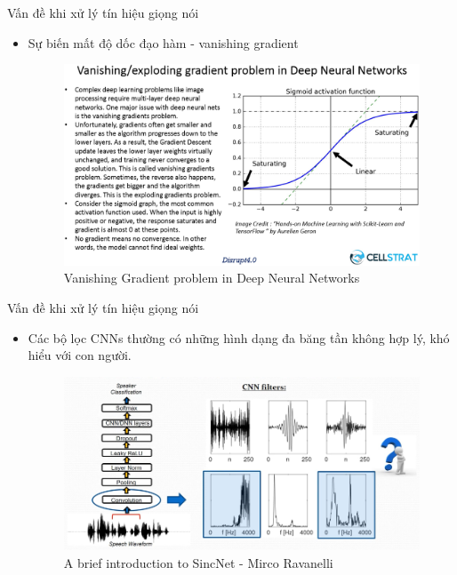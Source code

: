 \documentclass[notheorems, aspectratio=54]{beamer}
\begin{document}
\begin{frame}{Vấn đề khi xử lý tín hiệu giọng nói}
	\begin{itemize}
		\item Sự biến mất độ dốc đạo hàm - vanishing gradient
		\begin{figure}[H]
			\includegraphics[width=0.75\linewidth]{images/Vanishing-Gradients-in-DNN.png}
			\caption{Vanishing Gradient problem in Deep Neural Networks}
			\label{fig:writing-thesis}
		\end{figure}
	\end{itemize}
\end{frame}
\begin{frame}{Vấn đề khi xử lý tín hiệu giọng nói}
	\begin{itemize}
		\item Các bộ lọc CNNs thường có những hình dạng đa băng tần không hợp lý, khó hiểu với con người.
		\begin{figure}[H]
			\includegraphics[width=0.9\linewidth]{images/interpretability_problems.png}
			\caption{A brief introduction to SincNet - Mirco Ravanelli}
			\label{fig:writing-thesis}
		\end{figure}
	\end{itemize}
\end{frame}
\end{document}

